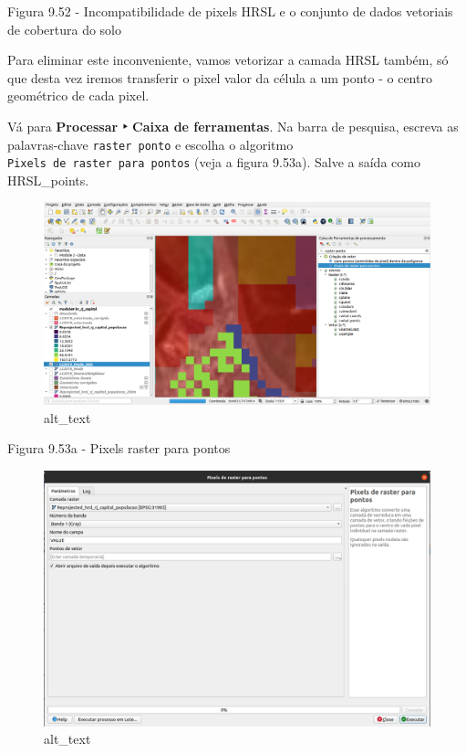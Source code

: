 \documentclass[
]{book}
\begin{document}
Figura 9.52 - Incompatibilidade de pixels HRSL e o conjunto de dados vetoriais de cobertura do solo

Para eliminar este inconveniente, vamos vetorizar a camada HRSL também, só que desta vez iremos transferir o pixel valor da célula a um ponto - o centro geométrico de cada pixel.

Vá para \textbf{Processar ‣ Caixa de ferramentas}. Na barra de pesquisa, escreva as palavras-chave \texttt{raster\ ponto} e escolha o algoritmo \texttt{Pixels\ de\ raster\ para\ pontos} (veja a figura 9.53a). Salve a saída como HRSL\_points.

\begin{figure}
\centering
\includegraphics{media/modulo9/fig953_a.png}
\caption{alt\_text}
\end{figure}

Figura 9.53a - Pixels raster para pontos

\begin{figure}
\centering
\includegraphics{media/modulo9/fig953_b.png}
\caption{alt\_text}
\end{figure}
\end{document}
